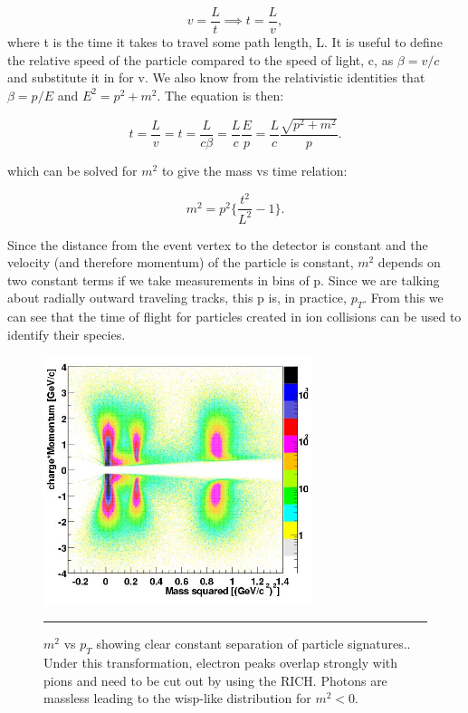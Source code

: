 \begin{equation}
v=\frac{L}{t} \implies t=\frac{L}{v},
\end{equation}
where t is the time it takes to travel some path length, L. It is useful to define the relative speed of the particle compared to the speed of light, c, as $\beta = v/c$ and substitute it in for v. We also know from the relativistic identities that $\beta = p/E$ and $E^{2} = p^{2} + m^{2}$. The equation is then: 

\begin{equation} \label{eqn:qmomentum}
t=\frac{L}{v} = t=\frac{L}{c\beta} = \frac{L}{c} \frac{E}{p} = \frac{L}{c} \frac{\sqrt{p^{2} + m^{2}}}{p}.
\end{equation}

which can be solved for $m^{2}$ to give the mass vs time relation:

\begin{equation} \label{eqn:m2tof}
m^{2} = p^{2} \bigg\{ \frac{t^{2}}{L^{2}} -1 \bigg\}.
\end{equation}

Since the distance from the event vertex to the detector is constant and the velocity (and therefore momentum) of the particle is constant, $m^{2}$ depends on two constant terms if we take measurements in bins of p. Since we are talking about radially outward traveling tracks, this p is, in practice, $p_{T}$. From this we can see that the time of flight for particles created in ion collisions can be used to identify their species.
\begin{figure}[htbp!]
  \centering
    \includegraphics[width=0.7\textwidth]{Figures/m2tofvspt.jpg}
    \rule{35em}{0.5pt}
  \caption[$m^{2}$ vs $p_{T}$ showing clear constant separation of particle signatures.]{$m^{2}$ vs $p_{T}$ showing clear constant separation of particle signatures.\citep{tofchargemom}. Under this transformation, electron peaks overlap strongly with pions and need to be cut out by using the RICH. Photons are massless leading to the wisp-like distribution for $m^2<0$.}
  \label{fig:m2tofvspt}
\end{figure}

\pagebreak
\pagebreak
